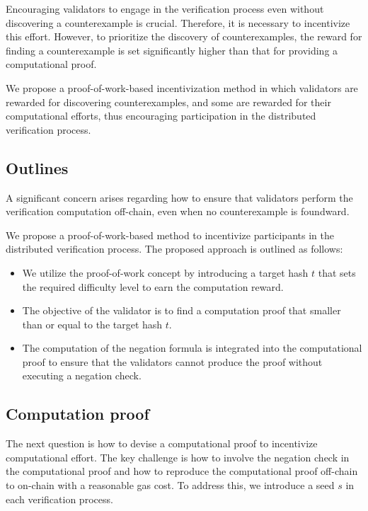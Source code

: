 \documentclass[runningheads]{llncs}
\begin{document}
Encouraging validators to engage in the verification process even without discovering a counterexample is crucial. Therefore, it is necessary to incentivize this effort. %
However, to prioritize the discovery of counterexamples, the reward for finding a counterexample is set significantly higher than that for providing a computational proof.

We propose a proof-of-work-based incentivization method in which validators are rewarded for discovering counterexamples, and some are rewarded for their computational efforts, thus encouraging participation in the distributed verification process.
\subsection{Outlines}
A significant concern arises regarding how to ensure that validators perform the verification computation off-chain, even when no counterexample is foundward.

We propose a proof-of-work-based method to incentivize participants in the distributed verification process.  The proposed approach is outlined as follows:
\begin{itemize}
\item We utilize the proof-of-work concept by introducing a target hash $t$ that sets the required difficulty level to earn the computation reward. 
\item The objective of the validator is to find a computation proof that smaller than or equal to the target hash $t$.
\item The computation of the negation formula is integrated into the computational proof to ensure that the validators cannot produce the proof without executing a negation check.
\end{itemize}
\subsection{Computation proof}
The next question is how to devise a computational proof to incentivize computational effort. The key challenge is how to involve the negation check in the computational proof and how to reproduce the computational proof off-chain to on-chain with a reasonable gas cost. To address this, we introduce a seed $s$ in each verification process.
\end{document}
